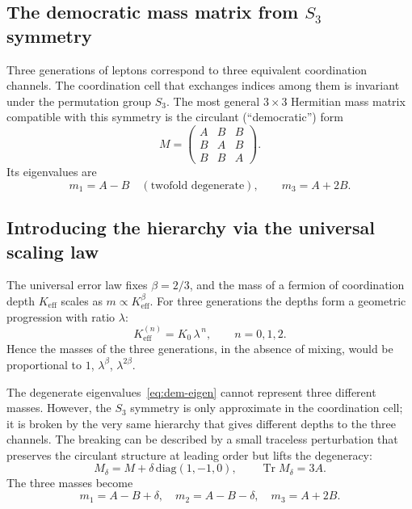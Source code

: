 \documentclass[12pt,a4paper]{article}
\begin{document}
\subsection{The democratic mass matrix from $S_3$ symmetry}

Three generations of leptons correspond to three equivalent coordination
channels.  The coordination cell that exchanges indices among them is invariant
under the permutation group $S_3$.  The most general $3\times3$ Hermitian mass
matrix compatible with this symmetry is the circulant (``democratic'') form
\begin{equation}
	M = \begin{pmatrix}
		A & B & B \\
		B & A & B \\
		B & B & A
	\end{pmatrix}.
	\label{eq:democratic}
\end{equation}
Its eigenvalues are
\begin{equation}
	m_1 = A - B \quad (\text{twofold degenerate}), \qquad
	m_3 = A + 2B .
	\label{eq:dem-eigen}
\end{equation}

\subsection{Introducing the hierarchy via the universal scaling law}

The universal error law fixes $\beta = 2/3$, and the mass of a fermion of
coordination depth $K_{\mathrm{eff}}$ scales as $m \propto K_{\mathrm{eff}}^{\beta}$.
For three generations the depths form a geometric progression with ratio
$\lambda$:
\[
K_{\mathrm{eff}}^{(n)} = K_0 \, \lambda^{\,n}, \qquad n = 0,1,2 .
\]
Hence the masses of the three generations, in the absence of mixing, would be
proportional to $1$, $\lambda^{\beta}$, $\lambda^{2\beta}$.

The degenerate eigenvalues~\eqref{eq:dem-eigen} cannot represent three
different masses.  However, the $S_3$ symmetry is only approximate in the
coordination cell; it is broken by the very same hierarchy that gives different
depths to the three channels.  The breaking can be described by a small
traceless perturbation that preserves the circulant structure at leading order
but lifts the degeneracy:
\begin{equation}
	M_\delta = M + \delta \,\mathrm{diag}(1,-1,0), \qquad \operatorname{Tr} M_\delta = 3A .
\end{equation}
The three masses become
\begin{equation}
	m_1 = A - B + \delta, \quad
	m_2 = A - B - \delta, \quad
	m_3 = A + 2B .
	\label{eq:three-masses}
\end{equation}
\end{document}
